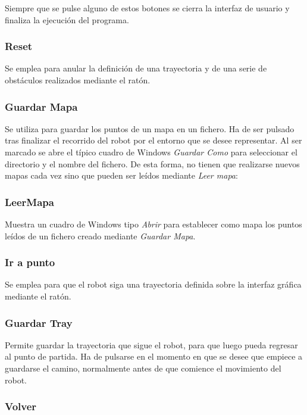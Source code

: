 Siempre que se pulse alguno de estos botones se cierra la interfaz de usuario y finaliza la ejecución del programa.

\subsubsection{Reset}
Se emplea para anular la definición de una trayectoria y de una serie de obstáculos realizados mediante el ratón.

\subsubsection{Guardar Mapa}

Se utiliza para guardar los puntos de un mapa en un fichero. Ha de ser pulsado tras finalizar el recorrido del robot por el entorno que se desee representar. Al ser marcado se abre el típico cuadro de Windows \emph{Guardar Como} para seleccionar el directorio y el nombre del fichero. De esta forma, no tienen que realizarse nuevos mapas cada vez sino que pueden ser leídos mediante \emph{Leer mapa}:

\subsubsection{LeerMapa}

Muestra un cuadro de Windows tipo \emph{Abrir} para establecer como mapa los puntos leídos de un fichero creado mediante \emph{Guardar Mapa}.

\subsubsection{Ir a punto}

Se emplea para que el robot siga una trayectoria definida sobre la interfaz gráfica mediante el ratón.

\subsubsection{Guardar Tray}

\noindent
Permite guardar la trayectoria que sigue el robot, para que luego pueda regresar al punto de partida. Ha de pulsarse en el momento en que se desee que empiece a guardarse el camino, normalmente antes de que comience el movimiento del robot.

\subsubsection{Volver}

